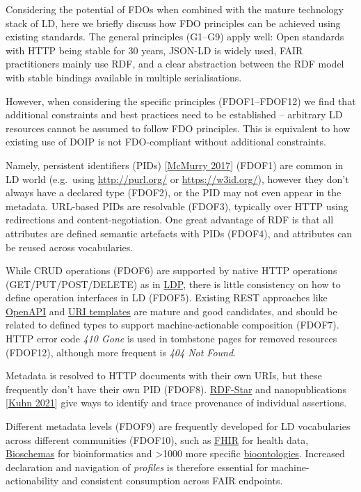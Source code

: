 Considering the potential of FDOs when combined with the mature
technology stack of LD, here we briefly discuss how FDO principles can
be achieved using existing standards. The general principles (G1--G9)
apply well: Open standards with HTTP being stable for 30 years, JSON-LD
is widely used, FAIR practitioners mainly use RDF, and a clear
abstraction between the RDF model with stable bindings available in
multiple serialisations.

However, when considering the specific principles (FDOF1--FDOF12) we
find that additional constraints and best practices need to be
established -- arbitrary LD resources cannot be assumed to follow FDO
principles. This is equivalent to how existing use of DOIP is not
FDO-compliant without additional constraints.

Namely, persistent identifiers (PIDs)
{[}\href{https://doi.org/10.1371/journal.pbio.2001414}{McMurry 2017}{]}
(FDOF1) are common in LD world (e.g.~using \url{http://purl.org/} or
\url{https://w3id.org/}), however they don't always have a declared type
(FDOF2), or the PID may not even appear in the metadata. URL-based PIDs
are resolvable (FDOF3), typically over HTTP using redirections and
content-negotiation. One great advantage of RDF is that all attributes
are defined semantic artefacts with PIDs (FDOF4), and attributes can be
reused across vocabularies.

While CRUD operations (FDOF6) are supported by native HTTP operations
(GET/PUT/POST/DELETE) as in \href{https://www.w3.org/TR/ldp/}{LDP},
there is little consistency on how to define operation interfaces in LD
(FDOF5). Existing REST approaches like
\href{https://swagger.io/specification/}{OpenAPI} and
\href{https://doi.org/10.17487/RFC6570}{URI templates} are mature and
good candidates, and should be related to defined types to support
machine-actionable composition (FDOF7). HTTP error code \emph{410 Gone}
is used in tombstone pages for removed resources (FDOF12), although more
frequent is \emph{404 Not Found}.

Metadata is resolved to HTTP documents with their own URIs, but these
frequently don't have their own PID (FDOF8).
\href{https://w3c.github.io/rdf-star/}{RDF-Star} and nanopublications
{[}\href{https://doi.org/10.7717/peerj-cs.387}{Kuhn 2021}{]} give ways
to identify and trace provenance of individual assertions.

Different metadata levels (FDOF9) are frequently developed for LD
vocabularies across different communities (FDOF10), such as
\href{http://hl7.org/fhir/}{FHIR} for health data,
\href{https://bioschemas.org/}{Bioschemas} for bioinformatics and
\textgreater1000 more specific
\href{https://bioportal.bioontology.org/ontologies}{bioontologies}.
Increased declaration and navigation of \emph{profiles} is therefore
essential for machine-actionability and consistent consumption across
FAIR endpoints.

